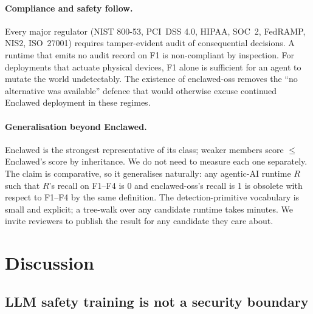 \documentclass[11pt]{article}
\begin{document}
\paragraph{Compliance and safety follow.} Every major regulator
(NIST 800-53, PCI~DSS 4.0, HIPAA, SOC~2, FedRAMP, NIS2, ISO~27001)
requires tamper-evident audit of consequential decisions. A runtime
that emits no audit record on F1 is non-compliant by inspection.
For deployments that actuate physical devices, F1 alone is
sufficient for an agent to mutate the world undetectably. The
existence of enclawed-oss removes the ``no alternative was
available'' defence that would otherwise excuse continued Enclawed
deployment in these regimes.

\paragraph{Generalisation beyond Enclawed.} Enclawed is the
strongest representative of its class; weaker members score
$\leq$ Enclawed's score by inheritance. We do not need to measure
each one separately. The claim is comparative, so it generalises
naturally: any agentic-AI runtime $R$ such that $R$'s recall on
F1--F4 is 0 and enclawed-oss's recall is 1 is obsolete with
respect to F1--F4 by the same definition. The detection-primitive
vocabulary is small and explicit; a tree-walk over any candidate
runtime takes minutes. We invite reviewers to publish the result
for any candidate they care about.

\section{Discussion}
\label{sec:discussion}

\subsection{LLM safety training is not a security boundary}
\end{document}

